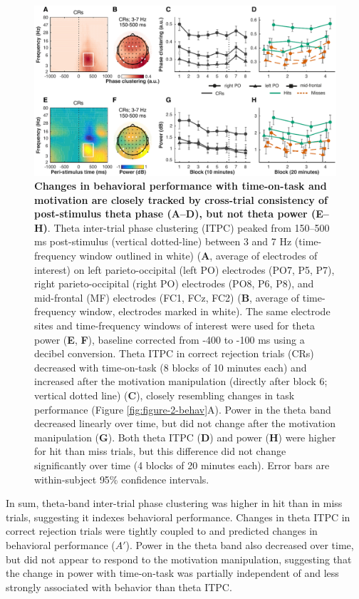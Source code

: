 \documentclass[11pt,]{memoir}
\begin{document}
\begin{figure}
\centering
\includegraphics{MFBrain_files/figures/figure_3_theta.pdf}
\caption{\label{fig:figure-3-theta}\textbf{Changes in behavioral performance with time-on-task and motivation are closely tracked by cross-trial consistency of post-stimulus theta phase (A--D), but not theta power (E--H)}. Theta inter-trial phase clustering (ITPC) peaked from 150--500 ms post-stimulus (vertical dotted-line) between 3 and 7 Hz (time-frequency window outlined in white) (\textbf{A}, average of electrodes of interest) on left parieto-occipital (left PO) electrodes (PO7, P5, P7), right parieto-occipital (right PO) electrodes (PO8, P6, P8), and mid-frontal (MF) electrodes (FC1, FCz, FC2) (\textbf{B}, average of time-frequency window, electrodes marked in white). The same electrode sites and time-frequency windows of interest were used for theta power (\textbf{E}, \textbf{F}), baseline corrected from -400 to -100 ms using a decibel conversion. Theta ITPC in correct rejection trials (CRs) decreased with time-on-task (8 blocks of 10 minutes each) and increased after the motivation manipulation (directly after block 6; vertical dotted line) (\textbf{C}), closely resembling changes in task performance (Figure \ref{fig:figure-2-behav}A). Power in the theta band decreased linearly over time, but did not change after the motivation manipulation (\textbf{G}). Both theta ITPC (\textbf{D}) and power (\textbf{H}) were higher for hit than miss trials, but this difference did not change significantly over time (4 blocks of 20 minutes each). Error bars are within-subject \autocites{Cousineau2005}{Morey2008} 95\% confidence intervals.}
\end{figure}

In sum, theta-band inter-trial phase clustering was higher in hit than in miss trials, suggesting it indexes behavioral performance. Changes in theta ITPC in correct rejection trials were tightly coupled to and predicted changes in behavioral performance (\(A'\)). Power in the theta band also decreased over time, but did not appear to respond to the motivation manipulation, suggesting that the change in power with time-on-task was partially independent of and less strongly associated with behavior than theta ITPC.
\end{document}
